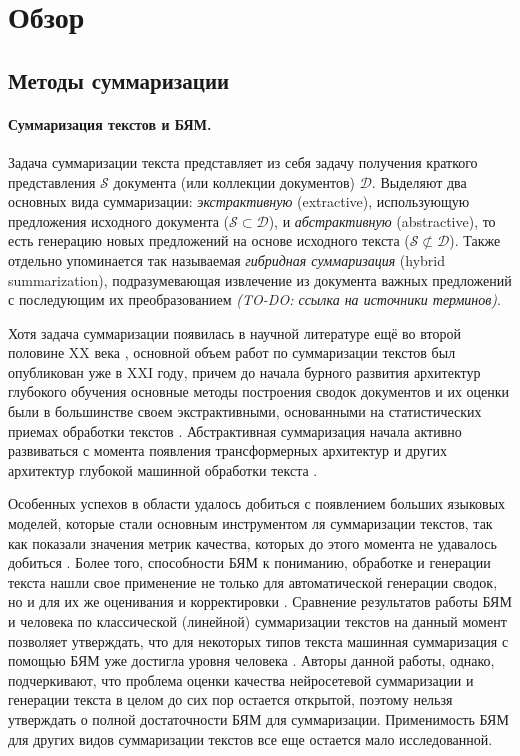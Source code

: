 \documentclass[12pt]{article}
\newcommand{\D}{\mathcal{D}}
\renewcommand{\S}{\mathcal{S}}
\begin{document}
\newpage
\section{Обзор}
\subsection{Методы суммаризации}

\paragraph{Суммаризация текстов и БЯМ.} Задача суммаризации текста представляет из себя задачу получения краткого представления $\S$ документа (или коллекции документов) $\D$. Выделяют два основных вида суммаризации: \textit{экстрактивную} (extractive), использующую предложения исходного документа ($\S\subset\D$), и \textit{абстрактивную} (abstractive), то есть генерацию новых предложений на основе исходного текста ($\S\not\subset\D$). Также отдельно упоминается так называемая \textit{гибридная суммаризация} (hybrid summarization), подразумевающая извлечение из документа важных предложений с последующим их преобразованием \textit{(TO-DO: ссылка на источники терминов)}. 

Хотя задача суммаризации появилась в научной литературе ещё во второй половине XX века \cite{luhn1958automatic}, основной объем работ по суммаризации текстов был опубликован уже в XXI году, причем до начала бурного развития архитектур глубокого обучения основные методы построения сводок документов и их оценки были в большинстве своем экстрактивными, основанными на статистических приемах обработки текстов \cite{allahyari2017text}. Абстрактивная суммаризация начала активно развиваться с момента появления трансформерных архитектур и других архитектур глубокой машинной обработки текста \cite{el2021automatic}. 

Особенных успехов в области удалось добиться с появлением больших языковых моделей, которые стали основным инструментом ля суммаризации текстов, так как показали значения метрик качества, которых до этого момента не удавалось добиться \cite{jin2024comprehensive}. Более того, способности БЯМ к пониманию, обработке и генерации текста нашли свое применение не только для автоматической генерации сводок, но и для их же оценивания и корректировки \cite{wu2023large}. Сравнение результатов работы БЯМ и человека по классической (линейной) суммаризации текстов на данный момент позволяет утверждать, что для некоторых типов текста машинная суммаризация с помощью БЯМ уже достигла уровня человека \cite{pu2023summarization}. Авторы данной работы, однако, подчеркивают, что проблема оценки качества нейросетевой суммаризации и генерации текста в целом до сих пор остается открытой, поэтому нельзя утверждать о полной достаточности БЯМ для суммаризации. Применимость БЯМ для других видов суммаризации текстов все еще остается мало исследованной.
\end{document}
